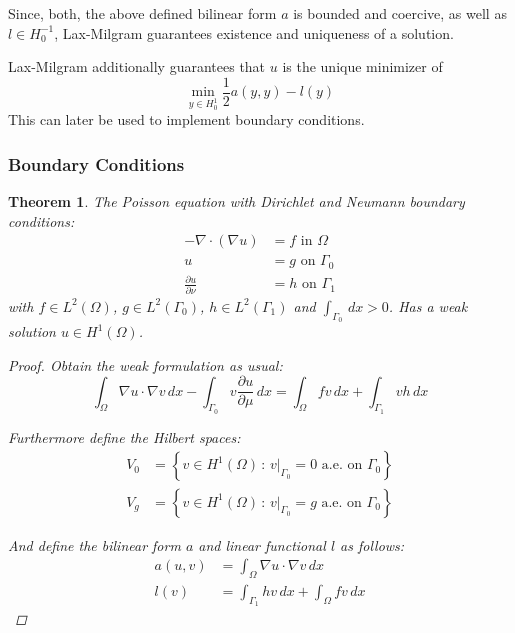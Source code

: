 \documentclass[11pt,a4paper]{article}
\newtheorem{theorem}{Theorem}[section]
\begin{document}
\begin{multicols}{2}
    Since, both, the above defined bilinear form $a$ is bounded and coercive, as well as $l \in H^{-1}_0$,
    Lax-Milgram guarantees existence and uniqueness of a solution.

    Lax-Milgram additionally guarantees that $u$ is the unique minimizer of
    \begin{equation}
      \min_{y \in H^1_0} \frac{1}{2}a(y,y) - l(y)
    \end{equation}
    This can later be used to implement boundary conditions.

  \subsubsection*{Boundary Conditions}
    \begin{theorem}
     The Poisson equation with Dirichlet and Neumann boundary conditions:
      \begin{align*}
        -\nabla \cdot \left( \nabla u \right) &= f  \text{ in } \Omega\\
        u &= g \text{ on } \Gamma_0\\
        \frac{\partial u}{\partial \nu} &= h \text{ on } \Gamma_1
      \end{align*}
      with $f \in L^2(\Omega)$, $g \in L^2(\Gamma_0)$, $h \in L^2(\Gamma_1)$ and $\int_{\Gamma_0}\,dx > 0$.
      Has a weak solution $u \in H^1(\Omega)$.

      \begin{proof}
        Obtain the weak formulation as usual:
        \begin{equation*}
          \label{eq:poisson_weak_boundaries}
          \int_\Omega \nabla u \cdot \nabla v \,dx - \int_{\Gamma_0} v \frac{\partial u}{\partial \mu} \,dx =
            \int_\Omega fv\,dx + \int_{\Gamma_1} vh\,dx
        \end{equation*}

        Furthermore define the Hilbert spaces:
        \begin{align*}
          V_0 &= \left\{ v \in H^1(\Omega)\, :\, v\vert_{\Gamma_0} = 0 \text{ a.e. on } \Gamma_0 \right\}\\
          V_g &= \left\{ v \in H^1(\Omega)\, :\, v\vert_{\Gamma_0} = g \text{ a.e. on } \Gamma_0 \right\}
        \end{align*}

        And define the bilinear form $a$ and linear functional $l$ as follows:
        \begin{align*}
          a(u,v) &= \int_\Omega \nabla u \cdot \nabla v \,dx\\
          l(v)   &= \int_{\Gamma_1} hv \,dx + \int_\Omega fv\,dx
        \end{align*}


\end{proof}
\end{theorem}
\end{multicols}
\end{document}
